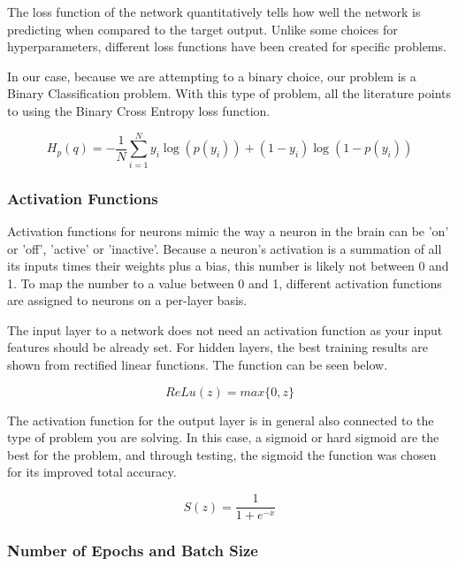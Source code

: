 \documentclass[%
 reprint,
 amsmath,amssymb,
 aps,
]{revtex4-2}
\begin{document}
The loss function of the network quantitatively tells how well the network is predicting when compared to the target output. Unlike some choices for hyperparameters, different loss functions have been created for specific problems.

In our case, because we are attempting to a binary choice, our problem is a Binary Classification problem. With this type of problem, all the literature points to using the Binary Cross Entropy loss function.

\begin{equation*}
    H_p(q) = -\frac{1}{N}\sum_{i=1}^N y_i \log(p(y_i)) + (1-y_i) \log(1-p(y_i))
\end{equation*}

\subsubsection{Activation Functions}

Activation functions for neurons mimic the way a neuron in the brain can be 'on' or 'off', 'active' or 'inactive'.  Because a neuron's activation is a summation of all its inputs times their weights plus a bias, this number is likely not between 0 and 1. To map the number to a value between 0 and 1, different activation functions are assigned to neurons on a per-layer basis.

The input layer to a network does not need an activation function as your input features should be already set. For hidden layers, the best training results are shown from rectified linear functions. The function can be seen below.

\begin{equation*}
    ReLu(z) = max\{0, z\}
\end{equation*}

The activation function for the output layer is in general also connected to the type of problem you are solving. In this case, a sigmoid or hard sigmoid are the best for the problem, and through testing, the sigmoid 
the function was chosen for its improved total accuracy.

\begin{equation*}
    S(z) = \frac{1}{1 + e^{-x}}
\end{equation*}

\subsubsection{Number of Epochs and Batch Size}
\end{document}

